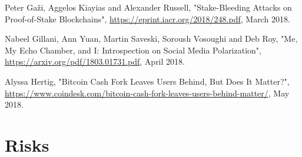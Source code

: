 \documentclass[12pt,a4paper]{article}
\begin{document}
\begin{thebibliography}{9}
Peter Gaži, Aggelos Kiayias and Alexander Russell,
"Stake-Bleeding Attacks on Proof-of-Stake Blockchains",
\url{https://eprint.iacr.org/2018/248.pdf},
March 2018.

Nabeel Gillani, Ann Yuan, Martin Saveski, Soroush Vosoughi and Deb Roy,
"Me, My Echo Chamber, and I: Introspection on Social Media Polarization",
\url{https://arxiv.org/pdf/1803.01731.pdf},
April 2018.

Alyssa Hertig,
"Bitcoin Cash Fork Leaves Users Behind, But Does It Matter?",
\url{https://www.coindesk.com/bitcoin-cash-fork-leaves-users-behind-matter/},
May 2018.

\end{thebibliography}

\newpage
\printglossary[type=\acronymtype]
\printglossary

\newpage
\appendix

\section{Risks}
\end{document}
